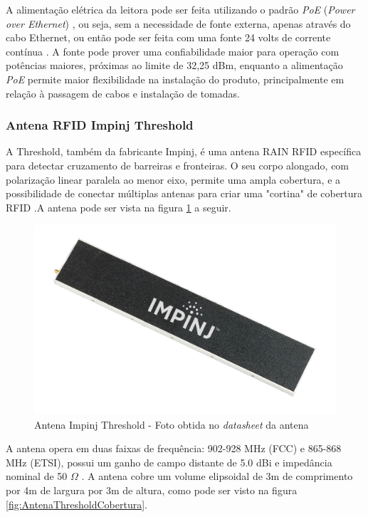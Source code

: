  A alimentação elétrica da leitora pode ser feita utilizando o padrão \textit{PoE} (\textit{Power over Ethernet}) \cite{SpeedwayRUserManual}, ou seja, sem a necessidade de fonte externa, apenas através do cabo Ethernet, ou então pode ser feita com uma fonte 24 volts de corrente contínua \cite{IEEE-SA-POE}. A fonte pode prover uma confiabilidade maior para operação com potências maiores, próximas ao limite de 32,25 dBm, enquanto a alimentação \textit{PoE} permite maior flexibilidade na instalação do produto, principalmente em relação à passagem de cabos e instalação de tomadas.
 
 \subsubsection{Antena RFID Impinj Threshold}
 
 A Threshold, também da fabricante Impinj, é uma antena RAIN RFID específica para detectar cruzamento de barreiras e fronteiras. O seu corpo alongado, com polarização linear paralela ao menor eixo, permite uma ampla cobertura, e a possibilidade de conectar múltiplas antenas para criar uma "cortina" de cobertura RFID \cite{AntenaThresholdDatasheet}.A antena pode ser vista na figura \ref{fig:AntenaThreshold_first} a seguir.
 
 \begin{figure}[H]
    \centering
    \includegraphics[width=0.5\linewidth]{figs/Metodologia/impinj_Threshold.png}
    \caption{Antena Impinj Threshold - Foto obtida no \textit{datasheet} da antena \cite{AntenaThresholdDatasheet}}
    \label{fig:AntenaThreshold_first}
\end{figure}
 
 A antena opera em duas faixas de frequência: 902-928 MHz (FCC) e 865-868 MHz (ETSI), possui um ganho de campo distante de 5.0 dBi e impedância nominal de 50 $\Omega$ \cite{AntenaThresholdDatasheet}. A antena cobre um volume elipsoidal de 3m de comprimento por 4m de largura por 3m de altura, como pode ser visto na figura \ref{fig:AntenaThresholdCobertura}.
 
